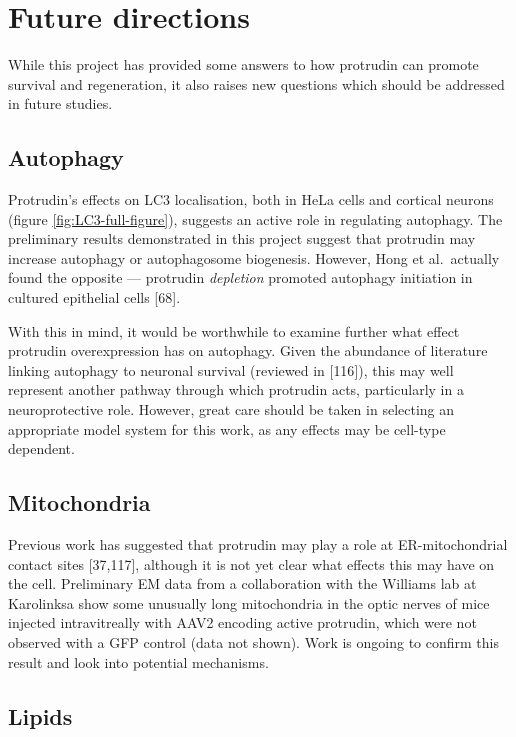 \documentclass[
  12pt,
  a4paper,
]{book}
\begin{document}
\hypertarget{future-directions}{%
\section{Future directions}\label{future-directions}}

While this project has provided some answers to how protrudin can promote survival and regeneration, it also raises new questions which should be addressed in future studies.

\hypertarget{autophagy}{%
\subsection{Autophagy}\label{autophagy}}

Protrudin's effects on LC3 localisation, both in HeLa cells and cortical neurons (figure \ref{fig:LC3-full-figure}), suggests an active role in regulating autophagy. The preliminary results demonstrated in this project suggest that protrudin may increase autophagy or autophagosome biogenesis. However, Hong et al.~actually found the opposite --- protrudin \emph{depletion} promoted autophagy initiation in cultured epithelial cells {[}68{]}.

With this in mind, it would be worthwhile to examine further what effect protrudin overexpression has on autophagy. Given the abundance of literature linking autophagy to neuronal survival (reviewed in {[}116{]}), this may well represent another pathway through which protrudin acts, particularly in a neuroprotective role. However, great care should be taken in selecting an appropriate model system for this work, as any effects may be cell-type dependent.

\hypertarget{mitochondria-1}{%
\subsection{Mitochondria}\label{mitochondria-1}}

Previous work has suggested that protrudin may play a role at ER-mitochondrial contact sites {[}37,117{]}, although it is not yet clear what effects this may have on the cell. Preliminary EM data from a collaboration with the Williams lab at Karolinksa show some unusually long mitochondria in the optic nerves of mice injected intravitreally with AAV2 encoding active protrudin, which were not observed with a GFP control (data not shown). Work is ongoing to confirm this result and look into potential mechanisms.

\hypertarget{lipids}{%
\subsection{Lipids}\label{lipids}}
\end{document}
